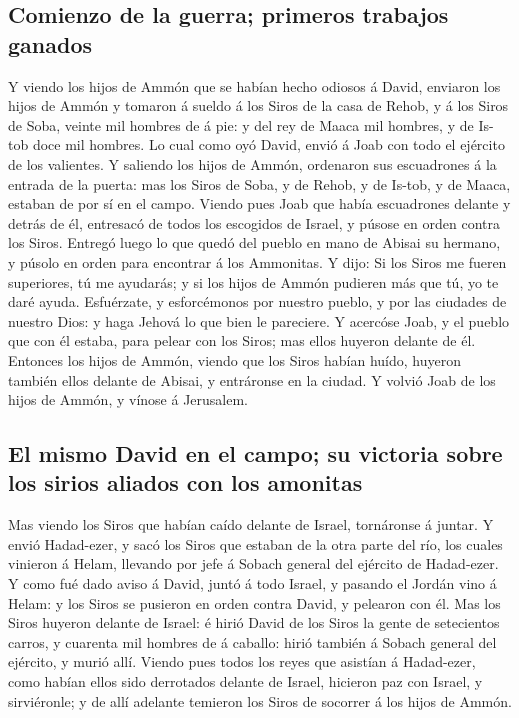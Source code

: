 \hypertarget{comienzo-de-la-guerra-primeros-trabajos-ganados}{%
\subsection{Comienzo de la guerra; primeros trabajos
ganados}\label{comienzo-de-la-guerra-primeros-trabajos-ganados}}

 Y viendo los hijos de Ammón que se habían hecho odiosos á
David, enviaron los hijos de Ammón y tomaron á sueldo á los Siros de la
casa de Rehob, y á los Siros de Soba, veinte mil hombres de á pie: y del
rey de Maaca mil hombres, y de Is-tob doce mil hombres.  Lo
cual como oyó David, envió á Joab con todo el ejército de los valientes.
 Y saliendo los hijos de Ammón, ordenaron sus escuadrones á
la entrada de la puerta: mas los Siros de Soba, y de Rehob, y de Is-tob,
y de Maaca, estaban de por sí en el campo.  Viendo pues Joab
que había escuadrones delante y detrás de él, entresacó de todos los
escogidos de Israel, y púsose en orden contra los Siros. 
Entregó luego lo que quedó del pueblo en mano de Abisai su hermano, y
púsolo en orden para encontrar á los Ammonitas.  Y dijo: Si
los Siros me fueren superiores, tú me ayudarás; y si los hijos de Ammón
pudieren más que tú, yo te daré ayuda.  Esfuérzate, y
esforcémonos por nuestro pueblo, y por las ciudades de nuestro Dios: y
haga Jehová lo que bien le pareciere.  Y acercóse Joab, y
el pueblo que con él estaba, para pelear con los Siros; mas ellos
huyeron delante de él.  Entonces los hijos de Ammón, viendo
que los Siros habían huído, huyeron también ellos delante de Abisai, y
entráronse en la ciudad. Y volvió Joab de los hijos de Ammón, y vínose á
Jerusalem.

\hypertarget{el-mismo-david-en-el-campo-su-victoria-sobre-los-sirios-aliados-con-los-amonitas}{%
\subsection{El mismo David en el campo; su victoria sobre los sirios
aliados con los
amonitas}\label{el-mismo-david-en-el-campo-su-victoria-sobre-los-sirios-aliados-con-los-amonitas}}

 Mas viendo los Siros que habían caído delante de Israel,
tornáronse á juntar.  Y envió Hadad-ezer, y sacó los Siros
que estaban de la otra parte del río, los cuales vinieron á Helam,
llevando por jefe á Sobach general del ejército de Hadad-ezer.
 Y como fué dado aviso á David, juntó á todo Israel, y
pasando el Jordán vino á Helam: y los Siros se pusieron en orden contra
David, y pelearon con él.  Mas los Siros huyeron delante de
Israel: é hirió David de los Siros la gente de setecientos carros, y
cuarenta mil hombres de á caballo: hirió también á Sobach general del
ejército, y murió allí.  Viendo pues todos los reyes que
asistían á Hadad-ezer, como habían ellos sido derrotados delante de
Israel, hicieron paz con Israel, y sirviéronle; y de allí adelante
temieron los Siros de socorrer á los hijos de Ammón.

